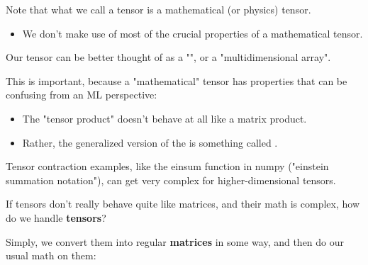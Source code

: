         \begin{clarification}
            Note that what we call a tensor is  a mathematical (or physics) tensor.

            \begin{itemize}
                \item We don't make use of most of the crucial properties of a mathematical tensor.
            \end{itemize}

            Our tensor can be better thought of as a "", or a "multidimensional array".

            \subsecdiv

            This is important, because a "mathematical" tensor has properties that can be confusing from an ML perspective:

            \begin{itemize}
                \item The "tensor product" doesn't behave at all like a matrix product.
                \item Rather, the generalized version of the  is something called .
            \end{itemize}

            Tensor contraction examples, like the einsum function in numpy ("einstein summation notation"), can get very complex for higher-dimensional tensors.
        \end{clarification}
        
        If tensors don't really behave quite like matrices, and their math is complex, how do we handle \textbf{tensors}? 
        
        Simply, we convert them into regular \textbf{matrices} in some way, and then do our usual math on them:
        

